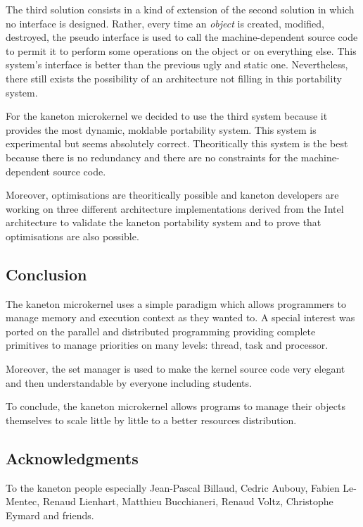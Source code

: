 \begin{multicols}{2}
The third solution consists in a kind of extension of the second solution
in which no interface is designed. Rather, every time an \textit{object} is
created, modified, destroyed, the pseudo interface is used to call the
machine-dependent source code to permit it to perform some operations
on the object or on everything else. This system's interface is better
than the previous ugly and static one. Nevertheless, there still exists the
possibility of an architecture not filling in this portability system.

For the kaneton microkernel we decided to use the third system because
it provides the most dynamic, moldable portability system. This system is
experimental but seems absolutely correct. Theoritically this system
is the best because there is no redundancy and there are no constraints
for the machine-dependent source code.

Moreover, optimisations are theoritically possible and kaneton developers
are working on three different architecture implementations derived from
the Intel architecture to validate the kaneton portability system and to
prove that optimisations are also possible.

%
%

\subsection{Conclusion}

The kaneton microkernel uses a simple paradigm which allows programmers to
manage memory and execution context as they wanted to. A special interest
was ported on the parallel and distributed programming providing complete
primitives to manage priorities on many levels: thread, task and processor.

Moreover, the set manager is used to make the kernel source code very elegant
and then understandable by everyone including students.

To conclude, the kaneton microkernel allows programs to manage their objects
themselves to scale little by little to a better resources distribution.

%
%

\subsection{Acknowledgments}

To the kaneton people especially Jean-Pascal Billaud, Cedric Aubouy,
Fabien Le-Mentec, Renaud Lienhart, Matthieu Bucchianeri, Renaud Voltz,
Christophe Eymard and friends.

\end{multicols}


